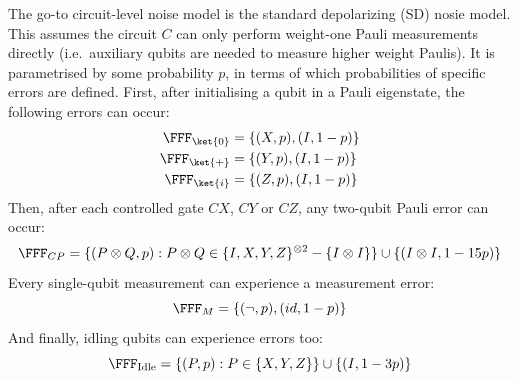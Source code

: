 \begin{example}
    The go-to circuit-level noise model is the standard depolarizing (SD) nosie model.
    This assumes the circuit $C$ can only perform weight-one Pauli measurements directly (i.e.\ auxiliary qubits are needed to measure higher weight Paulis).
    It is parametrised by some probability $p$, in terms of which probabilities of specific errors are defined.
    First, after initialising a qubit in a Pauli eigenstate, the following errors can occur:
    \begin{equation}
        \begin{aligned}
            \FFF_{\ket{0}} &= \{(X, p), (I, 1-p)\}\\
            \FFF_{\ket{+}} &= \{(Y, p), (I, 1-p)\}\\
            \FFF_{\ket{i}} &= \{(Z, p), (I, 1-p)\}
        \end{aligned}
    \end{equation}
    Then, after each controlled gate $CX$, $CY$ or $CZ$, any two-qubit Pauli error can occur:
    \begin{equation}
            \FFF_{CP} = \{(P \otimes Q, p) : P \otimes Q \in \{I, X, Y, Z\}^{\otimes 2} - \{I \otimes I\}\} \cup \{(I \otimes I, 1-15p)\}
    \end{equation}
    Every single-qubit measurement can experience a measurement error:
    \begin{equation}
        \FFF_M = \{(\neg, p), (id, 1-p)\}
    \end{equation}
    And finally, idling qubits can experience errors too:
    \begin{equation}
        \FFF_{\text{Idle}} = \{(P, p) : P \in \{X, Y, Z\}\} \cup \{(I, 1 - 3p)\}
    \end{equation}
\end{example}

